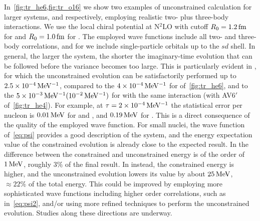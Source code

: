 \documentclass[aps,prc,twocolumn,superscriptaddress,floatfix]{revtex4-1}
\begin{document}
In~\cref{fig:tr_he6,fig:tr_o16} we show two examples of unconstrained calculation for larger systems,
 and  respectively, employing realistic two- plus three-body interactions. 
We use the local chiral potential at N$^2$LO with cutoff $R_0=1.2\,\rm fm$ for 
 and $R_0=1.0\,\rm fm$ for . The employed wave functions include 
all two- and three-body correlations, and for  we include single-particle orbitals 
up to the $sd$ shell. In general, the larger the system, the shorter 
the imaginary-time evolution that can be followed before the variance becomes too large. 
This is particularly evident in , for which the unconstrained evolution 
can be satisfactorily performed up to $2.5\times10^{-4}\,\rm MeV^{-1}$, 
compared to the $4\times10^{-4}\,\rm MeV^{-1}$
for  of~\cref{fig:tr_he6}, and to the $5\times10^{-3}\,\rm MeV^{-1}(10^{-2}\,\rm MeV^{-1})$ 
for  with the same interaction (with AV6$'$ of~\cref{fig:tr_he4}).
For example, at $\tau=2\times10^{-4}\,\rm MeV^{-1}$ the statistical error per nucleon is  
$0.01\,\rm MeV$ for  and , and $0.19\,\rm MeV$ for .
This is a direct consequence of the quality of the employed wave function. 
For small nuclei, the wave function of~\cref{eq:psi} provides a good description of the
system, and the energy expectation value of the constrained evolution is already close to the expected result. 
In  the difference between the constrained and unconstrained energy is of 
the order of $1\,\rm MeV$, roughly $3\%$ of the final result. 
In  instead, the constrained energy is higher, 
and the unconstrained evolution lowers 
its value by about $25\,\rm MeV$, $\approx22\%$ of the total energy.
This could be improved by employing more sophisticated wave functions including higher order
correlations, such as in~\cref{eq:psi2}, 
and/or using more refined techniques to perform the unconstrained evolution. 
Studies along these directions are underway.
\end{document}

